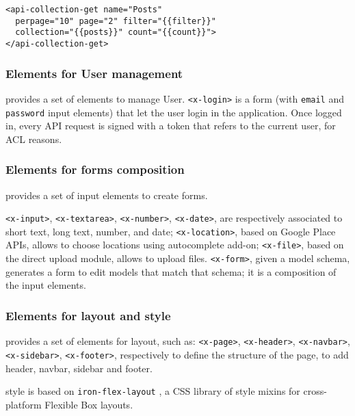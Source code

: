 \begin{lstlisting}[language=HTML5]
<api-collection-get name="Posts" 
  perpage="10" page="2" filter="{{filter}}"
  collection="{{posts}}" count="{{count}}">
</api-collection-get>
\end{lstlisting}


\subsubsection{Elements for User management}
 provides a set of elements to manage User.
\texttt{<x-login>} is a form (with \texttt{email} and \texttt{password} input elements) that let the user login in the application. Once logged in, every API request is signed with a token that refers to the current user, for ACL reasons.


\subsubsection{Elements for forms composition}
 provides a set of input elements to create forms. 

\texttt{<x-input>}, \texttt{<x-textarea>}, \texttt{<x-number>}, \texttt{<x-date>}, are respectively associated to short text, long text, number, and date; \texttt{<x-location>}, based on Google Place APIs, allows to choose locations using autocomplete add-on; \texttt{<x-file>}, based on the  direct upload module, allows to upload files.
\texttt{<x-form>}, given a model schema, generates a form to edit models that match that schema; it is a composition of the input elements.

\subsubsection{Elements for layout and style}
 provides a set of elements for layout, such as: \texttt{<x-page>}, \texttt{<x-header>}, \texttt{<x-navbar>}, \texttt{<x-sidebar>}, \texttt{<x-footer>}, respectively to define the structure of the page, to add header, navbar, sidebar and footer.

 style is based on \texttt{iron-flex-layout} \cite{iron-elements}, a CSS library of style mixins for cross-platform Flexible Box \cite{css-flexbox} layouts.
